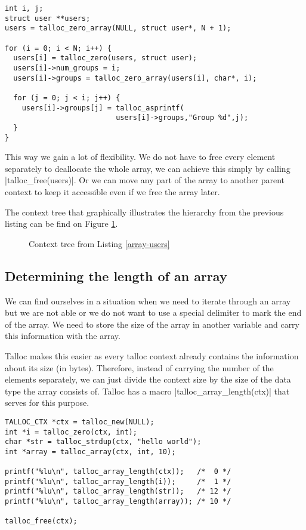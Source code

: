 \begin{lstlisting}[caption={Array of users and context hierarchy},
label={array-users}] int i, j;
struct user **users;
users = talloc_zero_array(NULL, struct user*, N + 1);

for (i = 0; i < N; i++) {
  users[i] = talloc_zero(users, struct user);
  users[i]->num_groups = i;
  users[i]->groups = talloc_zero_array(users[i], char*, i);
  
  for (j = 0; j < i; j++) {
    users[i]->groups[j] = talloc_asprintf(
                          users[i]->groups,"Group %d",j);
  }
}
\end{lstlisting}

\noindent
This way we gain a lot of flexibility. We do not have to free every element
separately to deallocate the whole array, we can achieve this simply by calling
|talloc_free(users)|. Or we can move any part of the array to another parent
context to keep it accessible even if we free the array later.

The context tree that graphically illustrates the hierarchy from the previous
listing can be find on Figure \ref{fig:context-tree-array}.

\begin{figure}[H]
  \centering
  
  \caption{Context tree from Listing \ref{array-users}}
  \label{fig:context-tree-array}
\end{figure}

\subsection{Determining the length of an array}

We can find ourselves in a situation when we need to iterate through an array
but we are not able or we do not want to use a special delimiter to mark the
end of the array. We need to store the size of the array in another variable and
carry this information with the array.

Talloc makes this easier as every talloc context already contains the
information about its size (in bytes). Therefore, instead of carrying the number
of the elements separately, we can just divide the context size by the size of
the data type the array consists of. Talloc has a macro
|talloc_array_length(ctx)| that serves for this purpose.

\begin{lstlisting}[caption={Length of an array},label=lst:array-length]
TALLOC_CTX *ctx = talloc_new(NULL);
int *i = talloc_zero(ctx, int);
char *str = talloc_strdup(ctx, "hello world");
int *array = talloc_array(ctx, int, 10);

printf("%lu\n", talloc_array_length(ctx));   /*  0 */
printf("%lu\n", talloc_array_length(i));     /*  1 */
printf("%lu\n", talloc_array_length(str));   /* 12 */
printf("%lu\n", talloc_array_length(array)); /* 10 */

talloc_free(ctx);
\end{lstlisting}

